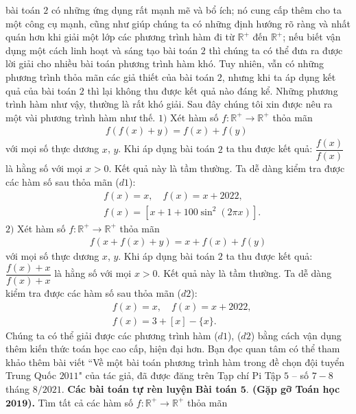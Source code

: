 \begin{multicols}{2}
		bài toán $2$ có những ứng dụng rất mạnh mẽ và bổ ích; nó cung cấp thêm cho ta một công cụ mạnh, cũng như giúp chúng ta có những định hướng rõ ràng và nhất quán hơn khi giải một lớp các phương trình hàm đi từ $\mathbb R^+$ đến
		$\mathbb R^+$; nếu biết vận dụng một cách linh hoạt và sáng tạo    
		bài toán $2$ thì chúng ta có thể đưa ra được lời giải cho nhiều bài toán phương trình hàm khó. Tuy nhiên, vẫn có những phương trình thỏa mãn các giả thiết của bài toán $2$, nhưng khi ta áp dụng kết quả của bài toán $2$ thì lại không thu được kết quả nào đáng kể. Những phương trình hàm như vậy, thường là rất khó giải. Sau đây chúng tôi xin được nêu ra một vài phương trình hàm như thế.
		\vskip 0.1cm
		$1)$ Xét hàm số $f: \mathbb R^+ \to \mathbb R^+$ thỏa mãn 
			\begin{align*}
				f(f(x)+y) = f(x)+f(y)\,\, \tag{$d1$}
			\end{align*}
			với mọi số thực dương $x$, $y$.
			Khi áp dụng 
			bài toán $2$ ta thu được kết quả: $\dfrac{{f(x)}}{{f(x)}}$ là hằng số với mọi $x>0$. Kết quả này  là tầm thường. Ta dễ dàng kiểm tra được các hàm số sau thỏa mãn ($d1$):
			\begin{align*}
				&f(x) = x,\quad f(x) =x+2022,\\
				&f(x) = \left[ {x + 1 + 100{{\sin }^2}(2\pi x)} \right].
			\end{align*}
			$2)$  Xét hàm số $f: \mathbb R^+ \to \mathbb R^+$ thỏa mãn 
			\begin{align*}
				f(x+f(x)+y)=x+f(x)+f(y)\tag{$d2$}
			\end{align*}
			với mọi số thực dương $x$, $y$.
			Khi áp dụng 
			bài toán $2$ ta thu được kết quả: $\dfrac{{f(x)+x}}{{f(x)+x}}$ là hằng số với mọi $x>0$. Kết quả này  là tầm thường. 
			Ta dễ dàng kiểm tra được các hàm số sau thỏa mãn ($d2$):
			\begin{align*}
				&f(x) = x,\quad 
				f(x) =x+2022,\\
				&f(x) = 3 + \left[ x \right] - \{ x\}.
			\end{align*}
		Chúng ta có thể giải được các phương trình hàm ($d1$), ($d2$) bằng cách vận dụng thêm 
		kiến thức toán học cao cấp, hiện đại  hơn. Bạn đọc quan tâm có thể tham khảo thêm bài viết ``Về một bài toán phương trình hàm trong đề chọn đội tuyển Trung Quốc $2011$" của tác giả, đã được đăng trên 
		Tạp chí Pi Tập $5$ -- số $7-8$ tháng $8/2021$.
	\vskip 0.1cm
	\textbf{\color{hoccungpi}Các bài toán tự rèn luyện}
	\vskip 0.1cm
	\textbf{\color{hoccungpi}Bài toán $\pmb{5.}$ (Gặp gỡ Toán học $\pmb{2019}$).}
	Tìm tất cả các hàm số $f: \mathbb{R}^{+} \rightarrow \mathbb{R}^{+}$ thỏa mãn

\end{multicols}
